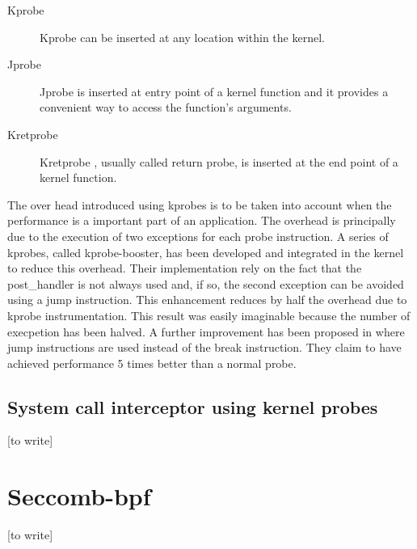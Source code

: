 \begin{description}
\item[Kprobe] Kprobe can be inserted at any location within the kernel. 
\item[Jprobe] Jprobe is inserted at entry point of a kernel function and it provides a  convenient way to access the function's arguments. 
\item[Kretprobe] Kretprobe , usually called return probe, is inserted at the end point of a kernel function.  
\end{description}
The over head introduced using kprobes is to be taken into account when the performance is a important part of an application. The overhead is principally due to the execution of two exceptions for each probe instruction. A series of kprobes, called kprobe-booster, has been developed and integrated in the kernel to reduce this overhead. Their implementation rely on the fact that the post\_handler is not always used and, if so,  the second exception can be avoided using a jump instruction. This enhancement reduces by half the overhead due to kprobe instrumentation. This result was easily imaginable because the number of execpetion has been halved. A further improvement has been proposed in \cite{Djprobe:2007} where jump instructions are used instead of the break instruction. They claim to have achieved performance 5 times better than a normal probe.   

\subsection{System call interceptor using kernel probes}

[to write]

\section{Seccomb-bpf}
[to write]

